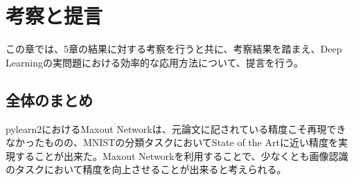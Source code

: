 \chapter{考察と提言}
この章では、5章の結果に対する考察を行うと共に、考察結果を踏まえ、Deep Learningの実問題における効率的な応用方法について、提言を行う。

\section{全体のまとめ}
pylearn2におけるMaxout Networkは、元論文に記されている精度こそ再現できなかったものの、MNISTの分類タスクにおいてState of the Artに近い精度を実現することが出来た。Maxout Networkを利用することで、少なくとも画像認識のタスクにおいて精度を向上させることが出来ると考えられる。\par
